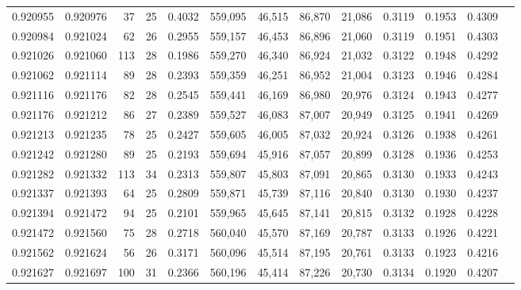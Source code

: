 \begin{tabular}{rrrrrrrrrrrrr}
0.920955 & 0.920976 &    37 &  25 &                                     0.4032 & 559,095 &  46,515 &  86,870 &  21,086 & 0.3119 & 0.1953 & 0.4309 \\
0.920984 & 0.921024 &    62 &  26 &                                     0.2955 & 559,157 &  46,453 &  86,896 &  21,060 & 0.3119 & 0.1951 & 0.4303 \\
0.921026 & 0.921060 &   113 &  28 &                                     0.1986 & 559,270 &  46,340 &  86,924 &  21,032 & 0.3122 & 0.1948 & 0.4292 \\
0.921062 & 0.921114 &    89 &  28 &                                     0.2393 & 559,359 &  46,251 &  86,952 &  21,004 & 0.3123 & 0.1946 & 0.4284 \\
0.921116 & 0.921176 &    82 &  28 &                                     0.2545 & 559,441 &  46,169 &  86,980 &  20,976 & 0.3124 & 0.1943 & 0.4277 \\
0.921176 & 0.921212 &    86 &  27 &                                     0.2389 & 559,527 &  46,083 &  87,007 &  20,949 & 0.3125 & 0.1941 & 0.4269 \\
0.921213 & 0.921235 &    78 &  25 &                                     0.2427 & 559,605 &  46,005 &  87,032 &  20,924 & 0.3126 & 0.1938 & 0.4261 \\
0.921242 & 0.921280 &    89 &  25 &                                     0.2193 & 559,694 &  45,916 &  87,057 &  20,899 & 0.3128 & 0.1936 & 0.4253 \\
0.921282 & 0.921332 &   113 &  34 &                                     0.2313 & 559,807 &  45,803 &  87,091 &  20,865 & 0.3130 & 0.1933 & 0.4243 \\
0.921337 & 0.921393 &    64 &  25 &                                     0.2809 & 559,871 &  45,739 &  87,116 &  20,840 & 0.3130 & 0.1930 & 0.4237 \\
0.921394 & 0.921472 &    94 &  25 &                                     0.2101 & 559,965 &  45,645 &  87,141 &  20,815 & 0.3132 & 0.1928 & 0.4228 \\
0.921472 & 0.921560 &    75 &  28 &                                     0.2718 & 560,040 &  45,570 &  87,169 &  20,787 & 0.3133 & 0.1926 & 0.4221 \\
0.921562 & 0.921624 &    56 &  26 &                                     0.3171 & 560,096 &  45,514 &  87,195 &  20,761 & 0.3133 & 0.1923 & 0.4216 \\
0.921627 & 0.921697 &   100 &  31 &                                     0.2366 & 560,196 &  45,414 &  87,226 &  20,730 & 0.3134 & 0.1920 & 0.4207 \\

\end{tabular}
